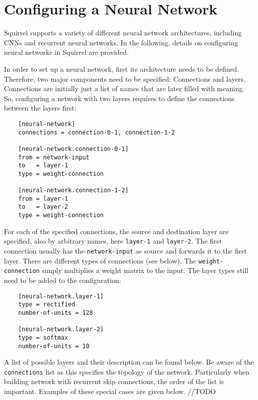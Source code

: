 \section{Configuring a Neural Network}


Squirrel supports a variety of different neural network architectures, including CNNs and recurrent neural networks. In the following, details on configuring neural networks in Squirrel are provided.

In order to set up a neural network, first its architecture needs to be defined. Therefore, two major components need to be specified: Connections and layers. Connections are initially just a list of names that are later filled with meaning. So, configuring a network with two layers requires to define the connections between the layers first:


\begin{verbatim}
    [neural-network]
    connections = connection-0-1, connection-1-2

    [neural-network.connection-0-1]
    from = network-input
    to   = layer-1
    type = weight-connection

    [neural-network.connection-1-2]
    from = layer-1
    to   = layer-2
    type = weight-connection
\end{verbatim}

For each of the specified connections, the source and destination layer are specified, also by arbitrary names, here \texttt{layer-1} and \texttt{layer-2}. The first connection usually has the \texttt{network-input} as source and forwards it to the first layer. There are different types of connections (see below). The \texttt{weight-connection} simply multiplies a weight matrix to the input. The layer types still need to be added to the configuration:

\begin{verbatim}
    [neural-network.layer-1]
    type = rectified
    number-of-units = 128

    [neural-network.layer-2]
    type = softmax
    number-of-units = 10
\end{verbatim}

A list of possible layers and their description can be found below. Be aware of the \texttt{connections} list as this specifies the topology of the network. Particularly when building network with recurrent skip connections, the order of the list is important. Examples of these special cases are given below. //TODO


